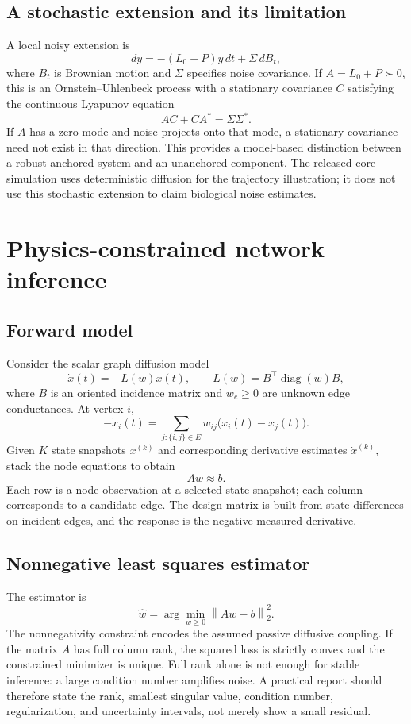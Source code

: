 \documentclass[12pt,a4paper]{article}
\DeclareMathOperator{\diag}{diag}
\newcommand{\norm}[1]{\left\lVert #1 \right\rVert}
\begin{document}
\subsection{A stochastic extension and its limitation}
A local noisy extension is
\[
dy=-(L_0+P)y\,dt+\Sigma\,dB_t,
\tag{16}\label{eq:sde}
\]
where \(B_t\) is Brownian motion and \(\Sigma\) specifies noise covariance. If \(A=L_0+P\succ0\), this is an Ornstein--Uhlenbeck process with a stationary covariance \(C\) satisfying the continuous Lyapunov equation
\[
AC+CA^*=\Sigma\Sigma^*.
\tag{17}\label{eq:lyapunov}
\]
If \(A\) has a zero mode and noise projects onto that mode, a stationary covariance need not exist in that direction. This provides a model-based distinction between a robust anchored system and an unanchored component. The released core simulation uses deterministic diffusion for the trajectory illustration; it does not use this stochastic extension to claim biological noise estimates.

\section{Physics-constrained network inference}
\subsection{Forward model}
Consider the scalar graph diffusion model
\[
\dot x(t)=-L(w)x(t),\qquad L(w)=B^\top\diag(w)B,
\tag{18}\label{eq:graphdiffusion}
\]
where \(B\) is an oriented incidence matrix and \(w_e\geq0\) are unknown edge conductances. At vertex \(i\),
\[
-\dot x_i(t)=\sum_{j:\{i,j\}\in E}w_{ij}\bigl(x_i(t)-x_j(t)\bigr).
\tag{19}\label{eq:nodebalance}
\]
Given \(K\) state snapshots \(x^{(k)}\) and corresponding derivative estimates \(\dot x^{(k)}\), stack the node equations to obtain
\[
Aw\approx b.
\tag{20}\label{eq:inverse}
\]
Each row is a node observation at a selected state snapshot; each column corresponds to a candidate edge. The design matrix is built from state differences on incident edges, and the response is the negative measured derivative.

\subsection{Nonnegative least squares estimator}
The estimator is
\[
\widehat w=\arg\min_{w\geq0}\norm{Aw-b}_2^2.
\tag{21}\label{eq:nnls}
\]
The nonnegativity constraint encodes the assumed passive diffusive coupling. If the matrix \(A\) has full column rank, the squared loss is strictly convex and the constrained minimizer is unique. Full rank alone is not enough for stable inference: a large condition number amplifies noise. A practical report should therefore state the rank, smallest singular value, condition number, regularization, and uncertainty intervals, not merely show a small residual.
\end{document}
